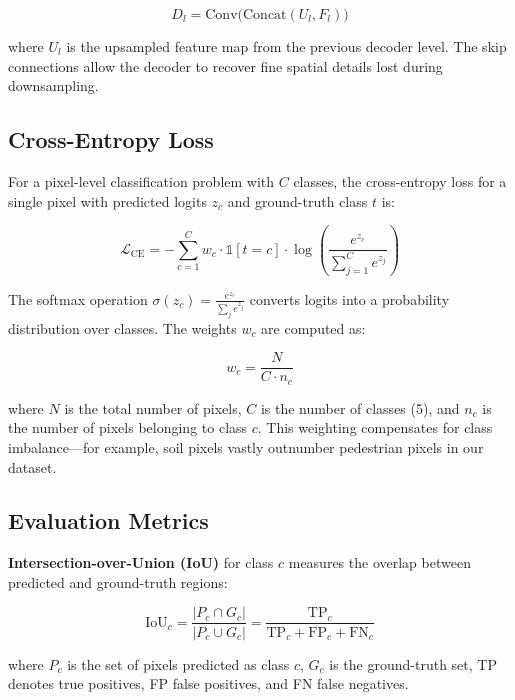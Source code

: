 \documentclass[12pt,a4paper]{article}
\begin{document}
\begin{equation}
    D_l = \text{Conv}\bigl(\text{Concat}(U_l, F_l)\bigr)
\end{equation}

where $U_l$ is the upsampled feature map from the previous decoder level. The skip connections allow the decoder to recover fine spatial details lost during downsampling.

\subsection{Cross-Entropy Loss}

For a pixel-level classification problem with $C$ classes, the cross-entropy loss for a single pixel with predicted logits $z_c$ and ground-truth class $t$ is:

\begin{equation}
    \mathcal{L}_{\text{CE}} = -\sum_{c=1}^{C} w_c \cdot \mathbb{1}[t = c] \cdot \log\left(\frac{e^{z_c}}{\sum_{j=1}^{C} e^{z_j}}\right)
\end{equation}

The softmax operation $\sigma(z_c) = \frac{e^{z_c}}{\sum_j e^{z_j}}$ converts logits into a probability distribution over classes. The weights $w_c$ are computed as:

\begin{equation}
    w_c = \frac{N}{C \cdot n_c}
\end{equation}

where $N$ is the total number of pixels, $C$ is the number of classes (5), and $n_c$ is the number of pixels belonging to class $c$. This weighting compensates for class imbalance---for example, soil pixels vastly outnumber pedestrian pixels in our dataset.

\subsection{Evaluation Metrics}

\textbf{Intersection-over-Union (IoU)} for class $c$ measures the overlap between predicted and ground-truth regions:

\begin{equation}
    \text{IoU}_c = \frac{|P_c \cap G_c|}{|P_c \cup G_c|} = \frac{\text{TP}_c}{\text{TP}_c + \text{FP}_c + \text{FN}_c}
\end{equation}

where $P_c$ is the set of pixels predicted as class $c$, $G_c$ is the ground-truth set, TP denotes true positives, FP false positives, and FN false negatives.
\end{document}
